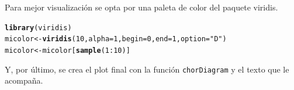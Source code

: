 \documentclass{article}\usepackage[]{graphicx}\usepackage[]{color}
\makeatletter
\newcommand{\hlnum}[1]{\textcolor[rgb]{0.686,0.059,0.569}{#1}}%
\newcommand{\hlstr}[1]{\textcolor[rgb]{0.192,0.494,0.8}{#1}}%
\newcommand{\hlopt}[1]{\textcolor[rgb]{0,0,0}{#1}}%
\newcommand{\hlstd}[1]{\textcolor[rgb]{0.345,0.345,0.345}{#1}}%
\newcommand{\hlkwb}[1]{\textcolor[rgb]{0.69,0.353,0.396}{#1}}%
\newcommand{\hlkwc}[1]{\textcolor[rgb]{0.333,0.667,0.333}{#1}}%
\newcommand{\hlkwd}[1]{\textcolor[rgb]{0.737,0.353,0.396}{\textbf{#1}}}%
\newenvironment{kframe}{%
 \def\at@end@of@kframe{}%
 \ifinner\ifhmode%
  \def\at@end@of@kframe{\end{minipage}}%
  \begin{minipage}{\columnwidth}%
 \fi\fi%
 \def\FrameCommand##1{\hskip\@totalleftmargin \hskip-\fboxsep
 \colorbox{shadecolor}{##1}\hskip-\fboxsep
     \hskip-\linewidth \hskip-\@totalleftmargin \hskip\columnwidth}%
 \MakeFramed {\advance\hsize-\width
   \@totalleftmargin\z@ \linewidth\hsize
   \@setminipage}}%
 {\par\unskip\endMakeFramed%
 \at@end@of@kframe}
\newenvironment{knitrout}{}{} %
\makeatother
\begin{document}
Para mejor visualizaci\'on se opta por una paleta de color del paquete viridis.
\begin{knitrout}
\color{fgcolor}\begin{kframe}
\begin{alltt}
\hlkwd{library}\hlstd{(viridis)}
\hlstd{micolor} \hlkwb{<-} \hlkwd{viridis}\hlstd{(}\hlnum{10}\hlstd{,} \hlkwc{alpha} \hlstd{=} \hlnum{1}\hlstd{,} \hlkwc{begin} \hlstd{=} \hlnum{0}\hlstd{,} \hlkwc{end} \hlstd{=} \hlnum{1}\hlstd{,} \hlkwc{option} \hlstd{=} \hlstr{"D"}\hlstd{)}
\hlstd{micolor} \hlkwb{<-} \hlstd{micolor[}\hlkwd{sample}\hlstd{(}\hlnum{1}\hlopt{:}\hlnum{10}\hlstd{)]}
\end{alltt}
\end{kframe}
\end{knitrout}
Y, por \'ultimo, se crea el plot final con la funci\'on \texttt{chorDiagram} y el texto que le acompa\~na.
\end{document}
